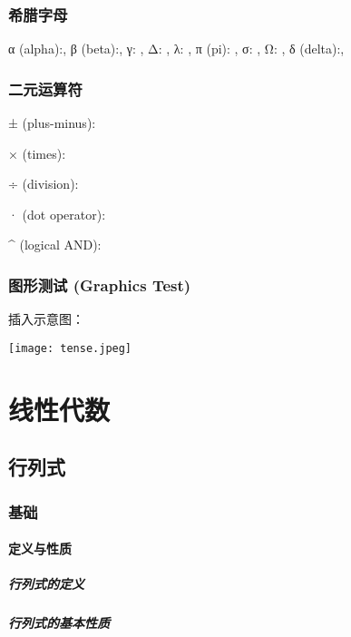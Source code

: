 \documentclass[a4paper,12pt]{article}
\begin{document}
    \section*{希腊字母}
    α (alpha):\alpha, \;
    β (beta):\beta, \;
    γ: \gamma, \;
    Δ: \Delta, \;
    λ: \lambda, \;
    π (pi): \pi, \;
    σ: \sigma, \;
    Ω: \Omega, \;
    δ (delta):\delta, \;


    \section*{二元运算符}
    ± (plus-minus):\pm

    × (times):\times

    ÷ (division):\div

    · (dot operator):\dot

    ^ (logical AND):\wedge

    \section*{图形测试 (Graphics Test)}
    插入示意图：

    \texttt{[image: tense.jpeg]}

    \part{线性代数}

    \chapter{行列式}

    \section{基础}
    \subsection{定义与性质}
    \subsubsection{行列式的定义}
    \subsubsection{行列式的基本性质}
\end{document}
